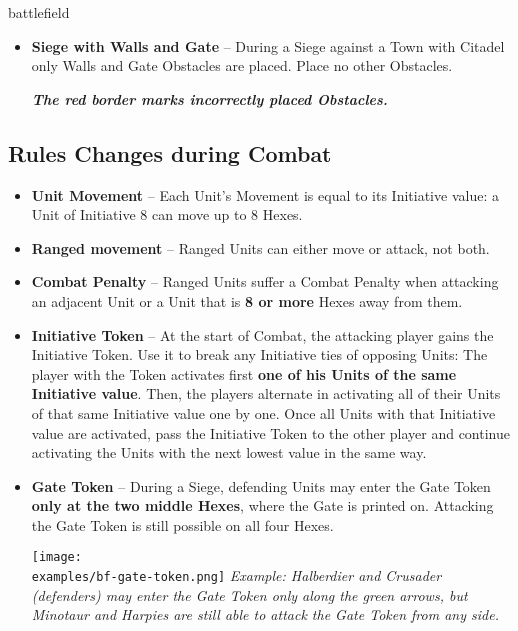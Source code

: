 \newpage
\begin{expansion}{battlefield}
  \begin{multicols*}{2}
  \begin{itemize}
    \item \textbf{Siege with Walls and Gate} – During a Siege against a Town with Citadel only Walls and Gate Obstacles are placed. Place no other Obstacles.

    {\footnotesize\textbf{\textit{\textcolor{darkcandyapplered}{The red border marks incorrectly placed Obstacles.}}}}
  \end{itemize}
  \subsection*{Rules Changes during Combat}
  \begin{itemize}
    \item \textbf{Unit Movement} – Each Unit's Movement is equal to its Initiative value: a Unit of Initiative 8 can move up to 8 Hexes.
    \item \textbf{Ranged movement}  – Ranged  Units can either move or attack, not both.
    \item \textbf{Combat Penalty} – Ranged  Units suffer a Combat Penalty when attacking an adjacent Unit or a Unit that is \textbf{8 or more} Hexes away from them.
    \columnbreak
    \item \textbf{Initiative Token} – At the start of Combat, the attacking player gains the Initiative Token.
    Use it to break any Initiative ties of opposing Units:
    The player with the Token activates first \textbf{one of his Units of the same Initiative value}.
    Then, the players alternate in activating all of their Units of that same Initiative value one by one.
    Once all Units with that Initiative value are activated, pass the Initiative Token to the other player and continue activating the Units with the next lowest value in the same way.
    \item \textbf{Gate Token} – During a Siege, defending Units may enter the Gate Token \textbf{only at the two middle Hexes}, where the Gate is printed on.
    Attacking the Gate Token is still possible on all four Hexes.

    \vspace*{1em}
    \texttt{[image: \\examples/bf-gate-token.png]}
    \footnotesize\textit{Example: Halberdier and Crusader (defenders) may enter the Gate Token only along the green arrows, but Minotaur and Harpies are still able to attack the Gate Token from any side.}
  \end{itemize}
  \end{multicols*}
\end{expansion}


